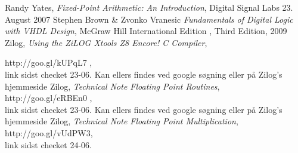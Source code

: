 \documentclass[12pt,a4paper]{article}
\begin{document}






%
%


%
\renewcommand{\refname}{\normalfont\selectfont\normalsize Kildeliste} 
\begin{thebibliography}{9}

   Randy Yates,
  \emph{Fixed-Point Arithmetic: An Introduction},
   Digital Signal Labs
  23. August
  2007
	Stephen Brown \& Zvonko Vranesic
	\emph{Fundamentals of Digital Logic with VHDL Design},
	McGraw Hill International Edition , Third Edition,
	2009
	Zilog,
 \emph{Using the ZiLOG Xtools Z8 Encore! C Compiler},

	http://goo.gl/kUPqL7 , \\ 
	link sidst checket 23-06. Kan ellers findes ved google søgning eller på Zilog's hjemmeside
	Zilog,
	\emph{Technical Note 
Floating Point Routines}, \\
	http://goo.gl/eRBEn0 , \\
	link sidst checket 23-06. Kan ellers findes ved google søgning eller på Zilog's hjemmeside
Zilog,
\emph{Technical Note
Floating Point Multiplication}, \\
http://goo.gl/vUdPW3, \\
link sidst checket 24-06.
\end{thebibliography}
\end{document}
